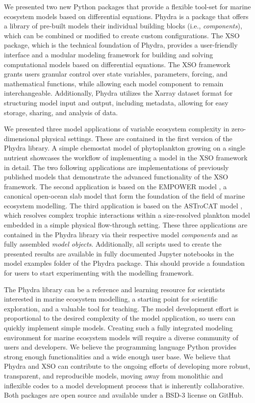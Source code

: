 \documentclass[journal abbreviation, manuscript]{copernicus}
\begin{document}
We presented two new Python packages that provide a flexible tool-set for marine ecosystem models based on differential equations. Phydra is a package that offers a library of pre-built models their individual building blocks (i.e., \textit{components}), which can be combined or modified to create custom configurations. The XSO package, which is the technical foundation of Phydra, provides a user-friendly interface and a modular modeling framework for building and solving computational models based on differential equations. The XSO framework grants users granular control over state variables, parameters, forcing, and mathematical functions, while allowing each model component to remain interchangeable. Additionally, Phydra utilizes the Xarray dataset format for structuring model input and output, including metadata, allowing for easy storage, sharing, and analysis of data.

We presented three model applications of variable ecosystem complexity in zero-dimensional physical settings. These are contained in the first version of the Phydra library. A simple chemostat model of phytoplankton growing on a single nutrient showcases the workflow of implementing a model in the XSO framework in detail. The two following applications are implementations of previously published models that demonstrate the advanced functionality of the XSO framework. The second application is based on the EMPOWER model \citep{Anderson2015c}, a canonical open-ocean slab model that form the foundation of the field of marine ecosystem modelling. The third application is based on the ASTroCAT model \citep{Banas2011b}, which resolves complex trophic interactions within a size-resolved plankton model embedded in a simple physical flow-through setting. These three applications are contained in the Phydra library via their respective model \textit{components} and as fully assembled \textit{model objects}. Additionally, all scripts used to create the presented results are available in fully documented Jupyter notebooks in the model examples folder of the Phydra package. This should provide a foundation for users to start experimenting with the modelling framework. 

The Phydra library can be a reference and learning resource for scientists interested in marine ecosystem modelling, a starting point for scientific exploration, and a valuable tool for teaching. The model development effort is proportional to the desired complexity of the model application, so users can quickly implement simple models. Creating such a fully integrated modeling environment for marine ecosystem models will require a diverse community of users and developers. We believe the programming language Python provides strong enough functionalities and a wide enough user base. We believe that Phydra and XSO can contribute to the ongoing efforts of developing more robust, transparent, and reproducible models, moving away from monolithic and inflexible codes to a model development process that is inherently collaborative. Both packages are open source and available under a BSD-3 license on GitHub.
\end{document}
